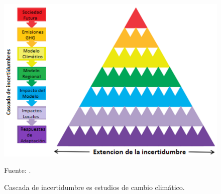 \begin{figure}[t]
	\includegraphics[scale=.64]{Images/tpbu.png}
	\centering
	\caption{Cascada de incertidumbre es estudios de cambio climático.}
    Fuente: \citet{Wilby2010}.
    \label{fig:tpbu}
\end{figure}
